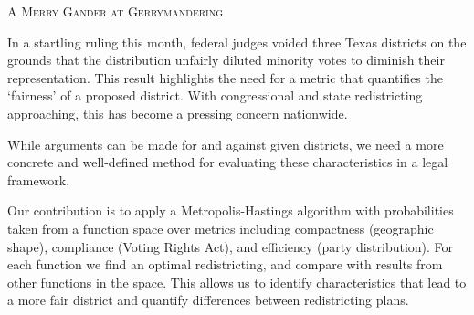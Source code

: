 \documentclass[twoside,11pt,reqno]{amsart}
\begin{document}
\begin{center}
{\scshape{A Merry Gander at Gerrymandering}}
\end{center}
\vspace{.5cm}
In a startling ruling this month, federal judges voided three Texas districts on the grounds 
that the distribution unfairly diluted minority votes to diminish their representation. 
This result highlights the need for a metric that quantifies the ‘fairness’ of a proposed 
district. 
With congressional and state redistricting approaching, this has become a pressing concern nationwide. 

While arguments can be made for and against given districts, we need a more concrete 
and well-defined method for evaluating these characteristics in a legal framework. 

Our contribution is to apply a Metropolis-Hastings algorithm with probabilities taken from a 
function space over metrics including compactness (geographic shape), compliance (Voting Rights Act), and efficiency (party distribution).
For each function we find an optimal redistricting, and compare with results from other functions in the space. 
This allows us to identify characteristics that lead to a more fair district and quantify differences between redistricting plans.
\end{document}
